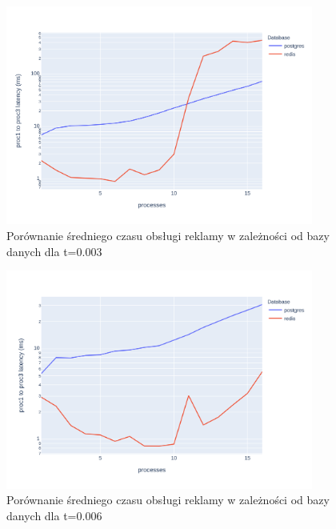 \documentclass[polish, 10pt]{article}
\begin{document}
\begin{figure}[H]
    \centering
    \includegraphics[width=0.9\textwidth]{./graphs/diff_in_end_postgres_vs_redis0003.png}
    \caption{Porównanie średniego czasu obsługi reklamy w zależności od bazy danych dla t=0.003}
\end{figure}

\begin{figure}[H]
    \centering
    \includegraphics[width=0.9\textwidth]{./graphs/diff_in_end_postgres_vs_redis0006.png}
    \caption{Porównanie średniego czasu obsługi reklamy w zależności od bazy danych dla t=0.006}
\end{figure}
\end{document}

